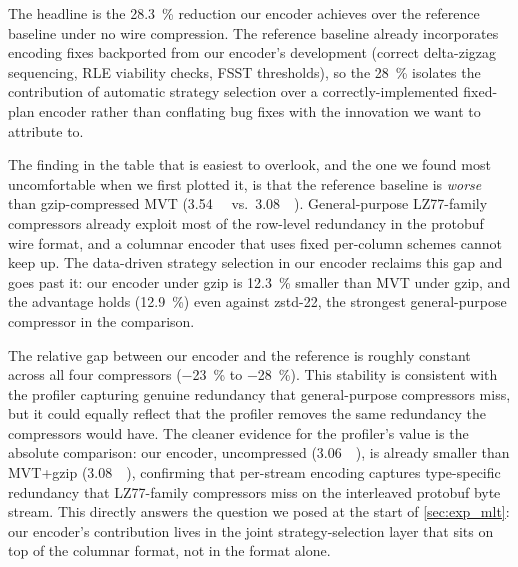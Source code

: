 The headline is the \qty{28.3}{\percent} reduction our encoder achieves over the reference baseline under no wire compression.
The reference baseline already incorporates encoding fixes backported from our encoder's development (correct delta-zigzag sequencing, \ac{RLE} viability checks, \ac{FSST} thresholds), so the \qty{28}{\percent} isolates the contribution of automatic strategy selection over a correctly-implemented fixed-plan encoder rather than conflating bug fixes with the innovation we want to attribute to.

The finding in the table that is easiest to overlook, and the one we found most uncomfortable when we first plotted it, is that the reference baseline is \emph{worse} than gzip-compressed \ac{MVT} (\qty{3.54}{\giga\byte} vs.\ \qty{3.08}{\giga\byte}).
General-purpose LZ77-family compressors already exploit most of the row-level redundancy in the protobuf wire format, and a columnar encoder that uses fixed per-column schemes cannot keep up.
The data-driven strategy selection in our encoder reclaims this gap and goes past it: our encoder under gzip is \qty{12.3}{\percent} smaller than \ac{MVT} under gzip, and the advantage holds (\qty{12.9}{\percent}) even against zstd-22, the strongest general-purpose compressor in the comparison.

The relative gap between our encoder and the reference is roughly constant across all four compressors (\qty{-23}{\percent} to \qty{-28}{\percent}).
This stability is consistent with the profiler capturing genuine redundancy that general-purpose compressors miss, but it could equally reflect that the profiler removes the same redundancy the compressors would have.
The cleaner evidence for the profiler's value is the absolute comparison: our encoder, uncompressed (\qty{3.06}{\giga\byte}), is already smaller than \ac{MVT}+gzip (\qty{3.08}{\giga\byte}), confirming that per-stream encoding captures type-specific redundancy that LZ77-family compressors miss on the interleaved protobuf byte stream.
This directly answers the question we posed at the start of \cref{sec:exp_mlt}: our encoder's contribution lives in the joint strategy-selection layer that sits on top of the columnar format, not in the format alone.


